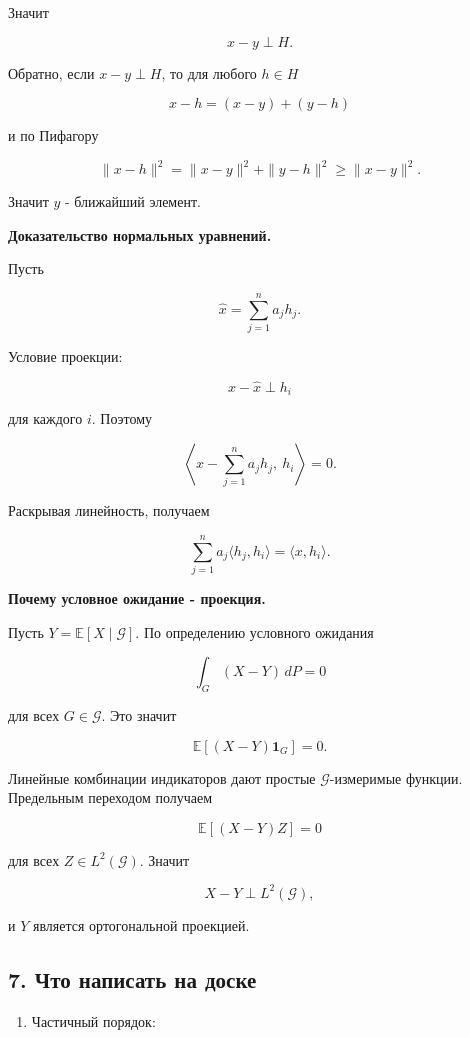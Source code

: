 \documentclass[
  11pt,
  a4paper,
]{article}
\providecommand{\tightlist}{%
  \setlength{\itemsep}{0pt}\setlength{\parskip}{0pt}}
\begin{document}
Значит

\[
x-y\perp H.
\]

Обратно, если \(x-y\perp H\), то для любого \(h\in H\)

\[
x-h=(x-y)+(y-h)
\]

и по Пифагору

\[
\|x-h\|^2=\|x-y\|^2+\|y-h\|^2\ge\|x-y\|^2.
\]

Значит \(y\) - ближайший элемент.

\textbf{Доказательство нормальных уравнений.}

Пусть

\[
\widehat x=\sum_{j=1}^n a_jh_j.
\]

Условие проекции:

\[
x-\widehat x\perp h_i
\]

для каждого \(i\). Поэтому

\[
\left\langle x-\sum_{j=1}^n a_jh_j,\ h_i\right\rangle=0.
\]

Раскрывая линейность, получаем

\[
\sum_{j=1}^n a_j\langle h_j,h_i\rangle=\langle x,h_i\rangle.
\]

\textbf{Почему условное ожидание - проекция.}

Пусть \(Y=\mathbb E[X\mid\mathcal G]\). По определению условного
ожидания

\[
\int_G(X-Y)\,dP=0
\]

для всех \(G\in\mathcal G\). Это значит

\[
\mathbb E[(X-Y)\mathbf 1_G]=0.
\]

Линейные комбинации индикаторов дают простые \(\mathcal G\)-измеримые
функции. Предельным переходом получаем

\[
\mathbb E[(X-Y)Z]=0
\]

для всех \(Z\in L^2(\mathcal G)\). Значит

\[
X-Y\perp L^2(\mathcal G),
\]

и \(Y\) является ортогональной проекцией.

\subsection{7. Что написать на
доске}\label{ux447ux442ux43e-ux43dux430ux43fux438ux441ux430ux442ux44c-ux43dux430-ux434ux43eux441ux43aux435}

\begin{enumerate}
\def\labelenumi{\arabic{enumi}.}
\tightlist
\item
  Частичный порядок:
\end{enumerate}
\end{document}
